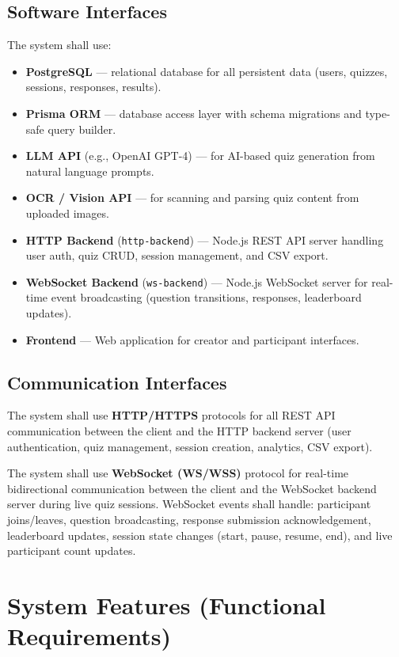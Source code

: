 \documentclass[12pt,a4paper]{article}
\begin{document}
\subsection{Software Interfaces}
The system shall use:
\begin{itemize}
  \item \textbf{PostgreSQL} --- relational database for all persistent data (users,
        quizzes, sessions, responses, results).
  \item \textbf{Prisma ORM} --- database access layer with schema migrations and
        type-safe query builder.
  \item \textbf{LLM API} (e.g., OpenAI GPT-4) --- for AI-based quiz generation
        from natural language prompts.
  \item \textbf{OCR / Vision API} --- for scanning and parsing quiz content from
        uploaded images.
  \item \textbf{HTTP Backend} (\texttt{http-backend}) --- Node.js REST API server
        handling user auth, quiz CRUD, session management, and CSV export.
  \item \textbf{WebSocket Backend} (\texttt{ws-backend}) --- Node.js WebSocket
        server for real-time event broadcasting (question transitions, responses,
        leaderboard updates).
  \item \textbf{Frontend} --- Web application for creator and participant interfaces.
\end{itemize}

\subsection{Communication Interfaces}
The system shall use \textbf{HTTP/HTTPS} protocols for all REST API communication
between the client and the HTTP backend server (user authentication, quiz management,
session creation, analytics, CSV export).

The system shall use \textbf{WebSocket (WS/WSS)} protocol for real-time
bidirectional communication between the client and the WebSocket backend server
during live quiz sessions. WebSocket events shall handle: participant joins/leaves,
question broadcasting, response submission acknowledgement, leaderboard updates,
session state changes (start, pause, resume, end), and live participant count updates.

\section{System Features (Functional Requirements)}
\end{document}
